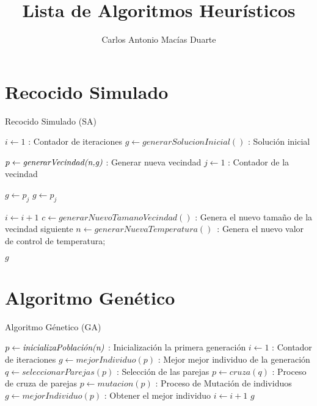 \documentclass[10pt,letterpaper,twoside,openright]{article}
\author{Carlos Antonio Macías Duarte}
\title{Lista de Algoritmos Heurísticos}
\begin{document}
	\maketitle
			
	\section{Recocido Simulado}
	
		\begin{algorithm}[H]
			\caption{Recocido Simulado (SA)}
				$ i \leftarrow 1 $ : Contador de iteraciones\;
				$ g \leftarrow generarSolucionInicial() $ : Solución inicial\;
				{
					$ p \leftarrow \emph{generarVecindad(n,g)}$ : Generar nueva vecindad\;
					$ j \leftarrow 1 $ : Contador de la vecindad\;
					{
						{
							$ g \leftarrow p_{j} $\;
						}
						{
							$ g \leftarrow p_{j} $\;
						}
						
					}			
					$ i \leftarrow  i + 1 $\;
					$ c \leftarrow  generarNuevoTamanoVecindad() $ : Genera el nuevo tamaño de la vecindad siguiente\;
					$ n \leftarrow  generarNuevaTemperatura() $\ :  Genera el nuevo valor de control de temperatura;
				}
		 		\Return $ g $
		 \end{algorithm}
	
	\section{Algoritmo Genético}
	
		\begin{algorithm}[H]
			\caption{Algoritmo Génetico (GA)}
				$ p \leftarrow \emph{inicializaPoblación(n)}$ : Inicialización la primera generación\;
				$ i \leftarrow 1 $ : Contador de iteraciones\;
				$ g \leftarrow mejorIndividuo(p) $ : Mejor mejor individuo de la generación\;
				{
					$q \leftarrow seleccionarParejas(p) $ : Selección de las parejas\;
					$ p \leftarrow cruza(q) $ : Proceso de cruza de parejas\;
					$ p \leftarrow mutacion(p) $ : Proceso de Mutación de individuos\;
					$ g \leftarrow mejorIndividuo(p) $ : Obtener el mejor individuo\;
					$ i \leftarrow  i + 1 $\;
				}
		 		\Return $ g $
		 \end{algorithm}
	
\end{document}
